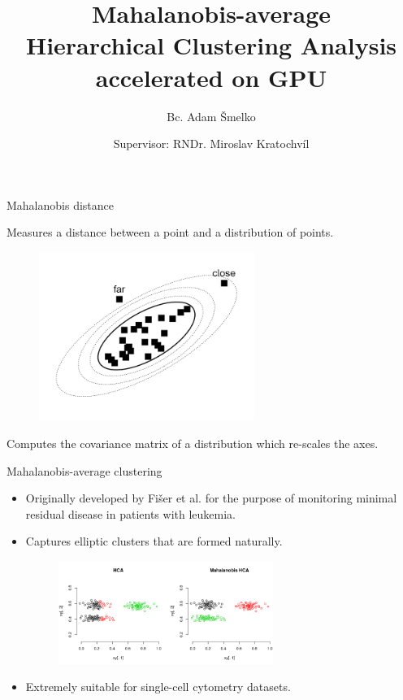 \documentclass[10pt]{beamer}
\title{Mahalanobis-average \\Hierarchical Clustering Analysis \\accelerated on GPU}
\author{Bc. Adam Šmelko}
\date{Supervisor: RNDr. Miroslav Kratochvíl}
\institute{Department of Software Engineering}
\begin{document}
\maketitle


\begin{frame}{Mahalanobis distance}
	
	Measures a distance between a point and a distribution of points.
	
	\begin{figure}
		\includegraphics[width=7cm]{img/maha_dist}
	\end{figure}

	Computes the covariance matrix of a distribution which re-scales the axes.
		
\end{frame}


\begin{frame}{Mahalanobis-average clustering}
	
	\begin{itemize}
		\item Originally developed by Fišer et al. for the purpose of monitoring
	minimal residual disease in patients with leukemia.
	\item Captures elliptic clusters that are formed naturally.
	
	\begin{figure}
		\includegraphics[width=7cm]{img/mhca}
	\end{figure}
	\item Extremely suitable for single-cell cytometry datasets.
	
	\end{itemize}
	
\end{frame}
\end{document}
